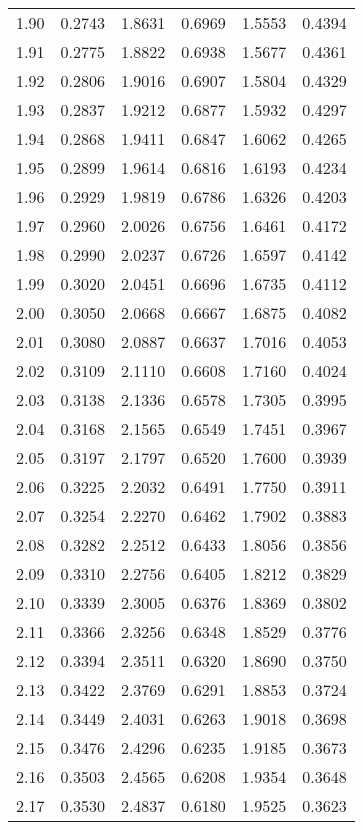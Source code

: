 \documentclass{article}
\begin{document}
\begin{longtable}{cccccc}
1.90 & 0.2743 & 1.8631 & 0.6969 & 1.5553 & 0.4394 \\
1.91 & 0.2775 & 1.8822 & 0.6938 & 1.5677 & 0.4361 \\
1.92 & 0.2806 & 1.9016 & 0.6907 & 1.5804 & 0.4329 \\
1.93 & 0.2837 & 1.9212 & 0.6877 & 1.5932 & 0.4297 \\
1.94 & 0.2868 & 1.9411 & 0.6847 & 1.6062 & 0.4265 \\
1.95 & 0.2899 & 1.9614 & 0.6816 & 1.6193 & 0.4234 \\
1.96 & 0.2929 & 1.9819 & 0.6786 & 1.6326 & 0.4203 \\
1.97 & 0.2960 & 2.0026 & 0.6756 & 1.6461 & 0.4172 \\
1.98 & 0.2990 & 2.0237 & 0.6726 & 1.6597 & 0.4142 \\
1.99 & 0.3020 & 2.0451 & 0.6696 & 1.6735 & 0.4112 \\
2.00 & 0.3050 & 2.0668 & 0.6667 & 1.6875 & 0.4082 \\
2.01 & 0.3080 & 2.0887 & 0.6637 & 1.7016 & 0.4053 \\
2.02 & 0.3109 & 2.1110 & 0.6608 & 1.7160 & 0.4024 \\
2.03 & 0.3138 & 2.1336 & 0.6578 & 1.7305 & 0.3995 \\
2.04 & 0.3168 & 2.1565 & 0.6549 & 1.7451 & 0.3967 \\
2.05 & 0.3197 & 2.1797 & 0.6520 & 1.7600 & 0.3939 \\
2.06 & 0.3225 & 2.2032 & 0.6491 & 1.7750 & 0.3911 \\
2.07 & 0.3254 & 2.2270 & 0.6462 & 1.7902 & 0.3883 \\
2.08 & 0.3282 & 2.2512 & 0.6433 & 1.8056 & 0.3856 \\
2.09 & 0.3310 & 2.2756 & 0.6405 & 1.8212 & 0.3829 \\
2.10 & 0.3339 & 2.3005 & 0.6376 & 1.8369 & 0.3802 \\
2.11 & 0.3366 & 2.3256 & 0.6348 & 1.8529 & 0.3776 \\
2.12 & 0.3394 & 2.3511 & 0.6320 & 1.8690 & 0.3750 \\
2.13 & 0.3422 & 2.3769 & 0.6291 & 1.8853 & 0.3724 \\
2.14 & 0.3449 & 2.4031 & 0.6263 & 1.9018 & 0.3698 \\
2.15 & 0.3476 & 2.4296 & 0.6235 & 1.9185 & 0.3673 \\
2.16 & 0.3503 & 2.4565 & 0.6208 & 1.9354 & 0.3648 \\
2.17 & 0.3530 & 2.4837 & 0.6180 & 1.9525 & 0.3623 \\

\end{longtable}
\end{document}

